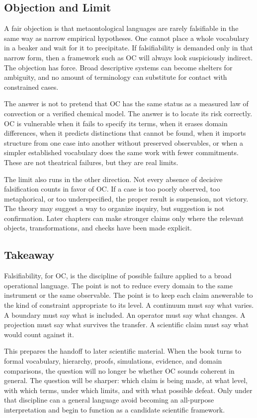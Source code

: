 \documentclass[11pt,a4paper,openany]{book}
\begin{document}
\subsection{Objection and Limit}
A fair objection is that metaontological languages are rarely falsifiable in the same way as narrow empirical hypotheses. One cannot place a whole vocabulary in a beaker and wait for it to precipitate. If falsifiability is demanded only in that narrow form, then a framework such as OC will always look suspiciously indirect. The objection has force. Broad descriptive systems can become shelters for ambiguity, and no amount of terminology can substitute for contact with constrained cases. \cite{haken_synergetics,nicolis_prigogine_selforg}\par
The answer is not to pretend that OC has the same status as a measured law of convection or a verified chemical model. The answer is to locate its risk correctly. OC is vulnerable when it fails to specify its terms, when it erases domain differences, when it predicts distinctions that cannot be found, when it imports structure from one case into another without preserved observables, or when a simpler established vocabulary does the same work with fewer commitments. These are not theatrical failures, but they are real limits.\par
The limit also runs in the other direction. Not every absence of decisive falsification counts in favor of OC. If a case is too poorly observed, too metaphorical, or too underspecified, the proper result is suspension, not victory. The theory may suggest a way to organize inquiry, but suggestion is not confirmation. Later chapters can make stronger claims only where the relevant objects, transformations, and checks have been made explicit.\par
\subsection{Takeaway}
Falsifiability, for OC, is the discipline of possible failure applied to a broad operational language. The point is not to reduce every domain to the same instrument or the same observable. The point is to keep each claim answerable to the kind of constraint appropriate to its level. A continuum must say what varies. A boundary must say what is included. An operator must say what changes. A projection must say what survives the transfer. A scientific claim must say what would count against it. \cite{haken_synergetics,nicolis_prigogine_selforg}\par
This prepares the handoff to later scientific material. When the book turns to formal vocabulary, hierarchy, proofs, simulations, evidence, and domain comparisons, the question will no longer be whether OC sounds coherent in general. The question will be sharper: which claim is being made, at what level, with which terms, under which limits, and with what possible defeat. Only under that discipline can a general language avoid becoming an all-purpose interpretation and begin to function as a candidate scientific framework.\par
\end{document}
